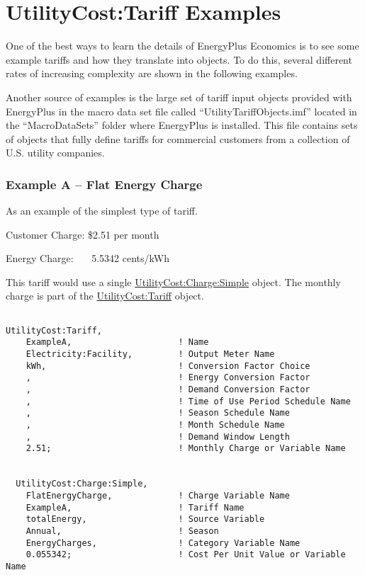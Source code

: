 \section{UtilityCost:Tariff Examples}\label{utilitycosttariff-examples}

One of the best ways to learn the details of EnergyPlus Economics is to see some example tariffs and how they translate into objects. To do this, several different rates of increasing complexity are shown in the following examples.

Another source of examples is the large set of tariff input objects provided with EnergyPlus in the macro data set file called ``UtilityTariffObjects.imf'' located in the ``MacroDataSets'' folder where EnergyPlus is installed. This file contains sets of objects that fully define tariffs for commercial customers from a collection of U.S. utility companies.

\subsubsection{Example A -- Flat Energy Charge}\label{example-a-flat-energy-charge}

As an example of the simplest type of tariff.

Customer Charge: \$2.51 per month

Energy Charge:~~~ 5.5342 cents/kWh

This tariff would use a single \hyperref[utilitycostchargesimple]{UtilityCost:Charge:Simple} object. The monthly charge is part of the \hyperref[utilitycosttariff]{UtilityCost:Tariff} object.

\begin{lstlisting}

UtilityCost:Tariff,
    ExampleA,                     ! Name
    Electricity:Facility,         ! Output Meter Name
    kWh,                          ! Conversion Factor Choice
    ,                             ! Energy Conversion Factor
    ,                             ! Demand Conversion Factor
    ,                             ! Time of Use Period Schedule Name
    ,                             ! Season Schedule Name
    ,                             ! Month Schedule Name
    ,                             ! Demand Window Length
    2.51;                         ! Monthly Charge or Variable Name


  UtilityCost:Charge:Simple,
    FlatEnergyCharge,             ! Charge Variable Name
    ExampleA,                     ! Tariff Name
    totalEnergy,                  ! Source Variable
    Annual,                       ! Season
    EnergyCharges,                ! Category Variable Name
    0.055342;                     ! Cost Per Unit Value or Variable Name
\end{lstlisting}

